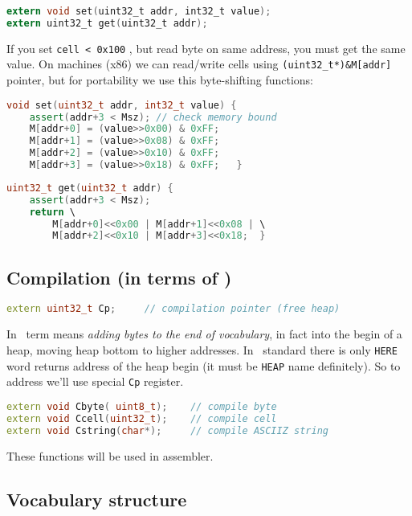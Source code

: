 \begin{lstlisting}[language=C]
extern void set(uint32_t addr, int32_t value);
extern uint32_t get(uint32_t addr);
\end{lstlisting}

If you set \verb|cell < 0x100| , but read byte on same address, you must get the
same value. On  machines (x86) we can read/write cells using
\verb|(uint32_t*)&M[addr]| pointer, but for portability we use this
byte-shifting functions:

\begin{lstlisting}[language=C++]
void set(uint32_t addr, int32_t value) {
	assert(addr+3 < Msz); // check memory bound
	M[addr+0] = (value>>0x00) & 0xFF;
	M[addr+1] = (value>>0x08) & 0xFF;
	M[addr+2] = (value>>0x10) & 0xFF;
	M[addr+3] = (value>>0x18) & 0xFF;	}
\end{lstlisting}
\begin{lstlisting}[language=C++]
uint32_t get(uint32_t addr) {
	assert(addr+3 < Msz);
	return \
		M[addr+0]<<0x00 | M[addr+1]<<0x08 | \
		M[addr+2]<<0x10 | M[addr+3]<<0x18;	}
\end{lstlisting}

\subsection{Compilation (in terms of \F)}

\begin{lstlisting}[language=C++]
extern uint32_t Cp;		// compilation pointer (free heap)
\end{lstlisting}

In \F\ term  means \textit{adding bytes to the end of
vocabulary}, in fact into the begin of a heap, moving heap bottom to higher
addresses. In \F\ standard there is only \verb|HERE| word returns address of
the heap begin (it must be \verb|HEAP| name definitely). So to address we'll use
special \verb|Cp| register.\label{Fheap}

\begin{lstlisting}[language=C++]
extern void Cbyte( uint8_t);	// compile byte
extern void Ccell(uint32_t);	// compile cell
extern void Cstring(char*);		// compile ASCIIZ string
\end{lstlisting}

\noindent
These functions will be used in assembler.

\subsection{Vocabulary structure}\label{vocabulary}

